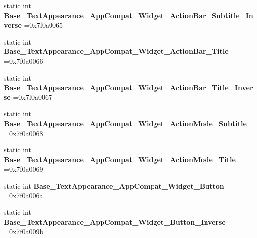 \begin{DoxyCompactItemize}
static int {\bfseries Base\+\_\+\+Text\+Appearance\+\_\+\+App\+Compat\+\_\+\+Widget\+\_\+\+Action\+Bar\+\_\+\+Subtitle\+\_\+\+Inverse} =0x7f0a0065
\item 
\mbox{\label{classandroid_1_1support_1_1graphics_1_1drawable_1_1R_1_1style_a9394275501cfc4a3c062276855cb3088}} 
static int {\bfseries Base\+\_\+\+Text\+Appearance\+\_\+\+App\+Compat\+\_\+\+Widget\+\_\+\+Action\+Bar\+\_\+\+Title} =0x7f0a0066
\item 
\mbox{\label{classandroid_1_1support_1_1graphics_1_1drawable_1_1R_1_1style_ae49319a3dbb8099acf8387093c0357e1}} 
static int {\bfseries Base\+\_\+\+Text\+Appearance\+\_\+\+App\+Compat\+\_\+\+Widget\+\_\+\+Action\+Bar\+\_\+\+Title\+\_\+\+Inverse} =0x7f0a0067
\item 
\mbox{\label{classandroid_1_1support_1_1graphics_1_1drawable_1_1R_1_1style_ad933dc827a3d33c169130a7e86431ab7}} 
static int {\bfseries Base\+\_\+\+Text\+Appearance\+\_\+\+App\+Compat\+\_\+\+Widget\+\_\+\+Action\+Mode\+\_\+\+Subtitle} =0x7f0a0068
\item 
\mbox{\label{classandroid_1_1support_1_1graphics_1_1drawable_1_1R_1_1style_ad772945907eb037a041e15e225eebc08}} 
static int {\bfseries Base\+\_\+\+Text\+Appearance\+\_\+\+App\+Compat\+\_\+\+Widget\+\_\+\+Action\+Mode\+\_\+\+Title} =0x7f0a0069
\item 
\mbox{\label{classandroid_1_1support_1_1graphics_1_1drawable_1_1R_1_1style_adb5c9521cf0fd4a8a691627f655b2b5b}} 
static int {\bfseries Base\+\_\+\+Text\+Appearance\+\_\+\+App\+Compat\+\_\+\+Widget\+\_\+\+Button} =0x7f0a006a
\item 
\mbox{\label{classandroid_1_1support_1_1graphics_1_1drawable_1_1R_1_1style_a06966f6b6be31690d8acf250443bd4fb}} 
static int {\bfseries Base\+\_\+\+Text\+Appearance\+\_\+\+App\+Compat\+\_\+\+Widget\+\_\+\+Button\+\_\+\+Inverse} =0x7f0a009b
\item 
\mbox{\label{classandroid_1_1support_1_1graphics_1_1drawable_1_1R_1_1style_ab3c5507b83236ba525ac8f788746569e}} 

\end{DoxyCompactItemize}

